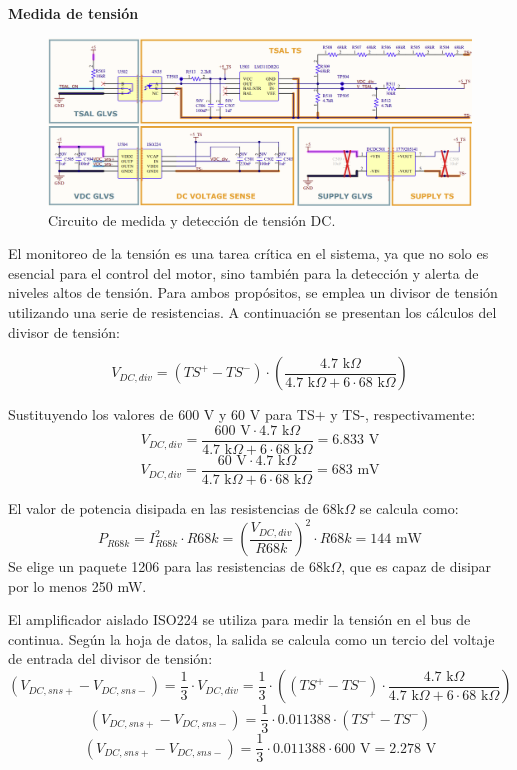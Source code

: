\textbf{Medida de tensión}

\begin{figure}[H]
	\centering
	\includegraphics[width=0.8\linewidth]{fig/Vmeas-sch}
	\caption{Circuito de medida y detección de tensión DC.}
\end{figure}

El monitoreo de la tensión es una tarea crítica en el sistema, ya que no solo es esencial para el control del motor, sino también para la detección y alerta de niveles altos de tensión. Para ambos propósitos, se emplea un divisor de tensión utilizando una serie de resistencias. A continuación se presentan los cálculos del divisor de tensión:

\[ V_{DC,div} = \left(TS^+ - TS^-\right) \cdot \left( \frac{4.7 \text{ k}\Omega}{4.7 \text{ k}\Omega + 6 \cdot 68 \text{ k}\Omega} \right) \]

Sustituyendo los valores de 600 V y 60 V para TS+ y TS-, respectivamente:
\[ V_{DC,div} = \frac{600 \text{ V} \cdot 4.7 \text{ k}\Omega}{4.7 \text{ k}\Omega + 6 \cdot 68 \text{ k}\Omega} = 6.833 \text{ V} \]
\[ V_{DC,div} = \frac{60 \text{ V} \cdot 4.7 \text{ k}\Omega}{4.7 \text{ k}\Omega + 6 \cdot 68 \text{ k}\Omega} = 683 \text{ mV} \]

El valor de potencia disipada en las resistencias de 68k$\Omega$ se calcula como:
\[ P_{R68k} = I_{R68k}^2 \cdot R68k = \left( \frac{V_{DC,div}}{R68k} \right)^2 \cdot R68k = 144 \text{ mW} \]
Se elige un paquete 1206 para las resistencias de 68k$\Omega$, que es capaz de disipar por lo menos 250 mW.

El amplificador aislado ISO224 se utiliza para medir la tensión en el bus de continua. Según la hoja de datos, la salida se calcula como un tercio del voltaje de entrada del divisor de tensión:
\[ (V_{DC,sns+} - V_{DC,sns-}) = \frac{1}{3} \cdot V_{DC,div} = \frac{1}{3} \cdot \left( (TS^+ - TS^-) \cdot \frac{4.7 \text{ k}\Omega}{4.7 \text{ k}\Omega + 6 \cdot 68 \text{ k}\Omega} \right) \]
\[ (V_{DC,sns+} - V_{DC,sns-}) = \frac{1}{3} \cdot 0.011388 \cdot (TS^+ - TS^-) \]
\[ (V_{DC,sns+} - V_{DC,sns-}) = \frac{1}{3} \cdot 0.011388 \cdot 600 \text{ V} = 2.278 \text{ V} \]

